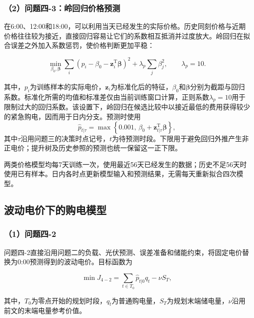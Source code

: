 \subsubsection*{（2）问题四-3：岭回归价格预测}

在6:00、12:00和18:00，可以利用当天已经发生的实际价格。历史同刻价格与近期价格往往较为接近，直接回归容易让它们的系数相互抵消并过度放大。岭回归在拟合误差之外加入系数惩罚，使价格判断更加平稳：

\begin{equation}
\min_{\beta_0,\boldsymbol{\beta}}
\sum_i
\left(
p_i-\beta_0-\mathbf{z}_i^{\mathrm T}\boldsymbol{\beta}
\right)^2
+
\lambda_p
\sum_j\beta_j^2,
\qquad
\lambda_p=10.
\end{equation}

其中，$p_i$为训练样本的实际电价，$\mathbf{z}_i$为标准化后的特征，$\beta_0$和$\boldsymbol{\beta}$分别为截距与回归系数。标准化所需的均值和标准差仅由当前训练窗口计算，正则系数$\lambda_p=10$用于限制过大的回归系数。该设置下，岭回归在候选比较中以接近最低的费用获得较少的紧急购电，因而用于日内分支。预测时使用
\begin{equation}
\hat p_{t|\tau}=\max\left\{0.001,\,\beta_0+\mathbf{z}_{t|\tau}^{\mathrm T}\boldsymbol{\beta}\right\},
\end{equation}
其中$\tau$沿用问题三的决策时点记号，$t$为待预测时段。下限用于避免回归外推产生非正电价；提升树及历史参照的预测也统一保留这一正下限。

两类价格模型均每7天训练一次，使用最近56天已经发生的数据；历史不足56天时使用已有样本。日内各时点更新模型输入和预测结果，无需每天重新拟合四次模型。

\subsection{波动电价下的购电模型}

\subsubsection*{（1）问题四-2}

问题四-2直接沿用问题二的负载、光伏预测、误差准备和储能约束，将固定电价替换为0:00预测得到的波动电价。目标函数为

\begin{equation}
\min J_{4-2}
=
\sum_{t\in T_0}
\hat{p}_{t|0}q_t
-
\nu S_T,
\end{equation}

其中，$T_0$为零点开始的规划时段，$q_t$为普通购电量，$S_T$为规划末端储电量，$\nu$沿用前文的末端电量参考价值。

